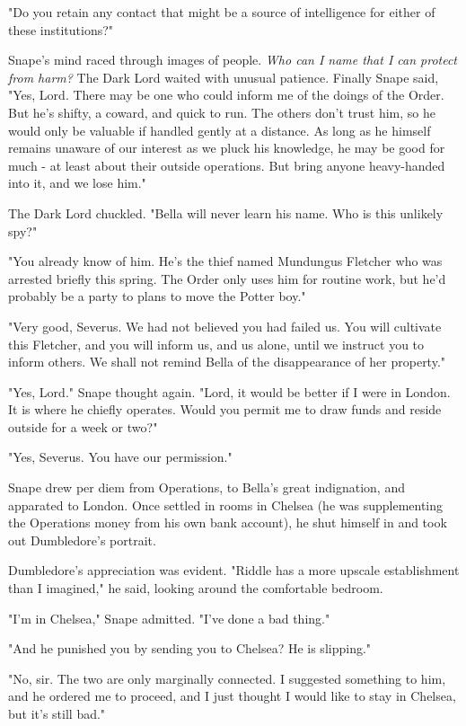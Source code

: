 "Do you retain any contact that might be a source of intelligence for either of these institutions?"

Snape's mind raced through images of people. \emph{Who can I name that I can protect from harm?} The Dark Lord waited with unusual patience. Finally Snape said, "Yes, Lord. There may be one who could inform me of the doings of the Order. But he's shifty, a coward, and quick to run. The others don't trust him, so he would only be valuable if handled gently at a distance. As long as he himself remains unaware of our interest as we pluck his knowledge, he may be good for much - at least about their outside operations. But bring anyone heavy-handed into it, and we lose him."

The Dark Lord chuckled. "Bella will never learn his name. Who is this unlikely spy?"

"You already know of him. He's the thief named Mundungus Fletcher who was arrested briefly this spring. The Order only uses him for routine work, but he'd probably be a party to plans to move the Potter boy."

"Very good, Severus. We had not believed you had failed us. You will cultivate this Fletcher, and you will inform us, and us alone, until we instruct you to inform others. We shall not remind Bella of the disappearance of her property."

"Yes, Lord." Snape thought again. "Lord, it would be better if I were in London. It is where he chiefly operates. Would you permit me to draw funds and reside outside for a week or two?"

"Yes, Severus. You have our permission."

Snape drew per diem from Operations, to Bella's great indignation, and apparated to London. Once settled in rooms in Chelsea (he was supplementing the Operations money from his own bank account), he shut himself in and took out Dumbledore's portrait.

Dumbledore's appreciation was evident. "Riddle has a more upscale establishment than I imagined," he said, looking around the comfortable bedroom.

"I'm in Chelsea," Snape admitted. "I've done a bad thing."

"And he punished you by sending you to Chelsea? He is slipping."

"No, sir. The two are only marginally connected. I suggested something to him, and he ordered me to proceed, and I just thought I would like to stay in Chelsea, but it's still bad."

